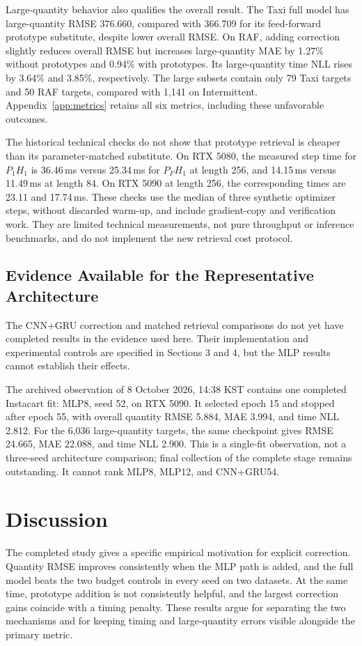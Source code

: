 \documentclass[runningheads]{llncs}
\begin{document}
Large-quantity behavior also qualifies the overall result. The Taxi full model has large-quantity RMSE 376.660, compared with 366.709 for its feed-forward prototype substitute, despite lower overall RMSE. On RAF, adding correction slightly reduces overall RMSE but increases large-quantity MAE by 1.27\% without prototypes and 0.94\% with prototypes. Its large-quantity time NLL rises by 3.64\% and 3.85\%, respectively. The large subsets contain only 79 Taxi targets and 50 RAF targets, compared with 1,141 on Intermittent. Appendix~\ref{app:metrics} retains all six metrics, including these unfavorable outcomes.

The historical technical checks do not show that prototype retrieval is cheaper than its parameter-matched substitute. On RTX 5080, the measured step time for $P_1H_1$ is 36.46\,ms versus 25.34\,ms for $P_FH_1$ at length 256, and 14.15\,ms versus 11.49\,ms at length 84. On RTX 5090 at length 256, the corresponding times are 23.11 and 17.74\,ms. These checks use the median of three synthetic optimizer steps, without discarded warm-up, and include gradient-copy and verification work. They are limited technical measurements, not pure throughput or inference benchmarks, and do not implement the new retrieval cost protocol.

\subsection{Evidence Available for the Representative Architecture}
The CNN+GRU correction and matched retrieval comparisons do not yet have completed results in the evidence used here. Their implementation and experimental controls are specified in Sections 3 and 4, but the MLP results cannot establish their effects.

The archived observation of 8 October 2026, 14:38 KST contains one completed Instacart fit: MLP8, seed 52, on RTX 5090. It selected epoch 15 and stopped after epoch 55, with overall quantity RMSE 5.884, MAE 3.994, and time NLL 2.812. For the 6,036 large-quantity targets, the same checkpoint gives RMSE 24.665, MAE 22.088, and time NLL 2.900. This is a single-fit observation, not a three-seed architecture comparison; final collection of the complete stage remains outstanding. It cannot rank MLP8, MLP12, and CNN+GRU54.

\section{Discussion}
The completed study gives a specific empirical motivation for explicit correction. Quantity RMSE improves consistently when the MLP path is added, and the full model beats the two budget controls in every seed on two datasets. At the same time, prototype addition is not consistently helpful, and the largest correction gains coincide with a timing penalty. These results argue for separating the two mechanisms and for keeping timing and large-quantity errors visible alongside the primary metric.
\end{document}
